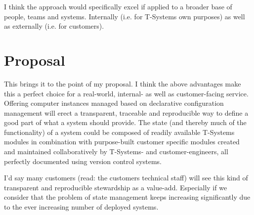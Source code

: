 \documentclass[12pt, a4paper]{article}
\begin{document}
I think the approach would specifically excel if applied to a broader base of people, teams and systems. Internally (i.e. for T-Systems own purposes) as well as externally (i.e. for customers).

\section{Proposal}
This brings it to the point of my proposal. I think the above advantages make this a perfect choice for a real-world, internal- as well as customer-facing service. Offering computer instances managed based on declarative configuration management will erect a transparent, traceable and reproducible way to define a good part of what a system should provide. The state (and thereby much of the functionality) of a system could be composed of readily available T-Systems modules in combination with purpose-built customer specific modules created and maintained collaboratively by T-Systems- and customer-engineers, all perfectly documented using version control systems.

I'd say many customers (read: the customers technical staff) will see this kind of transparent and reproducible stewardship as a value-add. Especially if we consider that the problem of state management keeps increasing significantly due to the ever increasing number of deployed systems.
\end{document}
